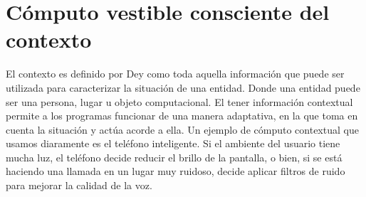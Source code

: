 \documentclass[letterpaper,12pt]{cicese}
\begin{document}
			\section{C\'omputo vestible consciente del contexto}

				El contexto es definido por Dey \citep{Dey2001} como toda aquella informaci\'on que puede ser utilizada para caracterizar la situaci\'on de una entidad. Donde una
				entidad puede ser una persona, lugar u objeto computacional. El tener informaci\'on contextual permite a los programas funcionar de una manera adaptativa,
				en la que toma en cuenta la situaci\'on y act\'ua acorde a ella. Un ejemplo de c\'omputo contextual que usamos diaramente es el tel\'efono inteligente.
				Si el ambiente del usuario tiene mucha luz, el tel\'efono decide reducir el brillo de la pantalla, o bien, si se est\'a haciendo una llamada en un lugar muy ruidoso,
				decide aplicar filtros de ruido para mejorar la calidad de la voz.
		
\end{document}
